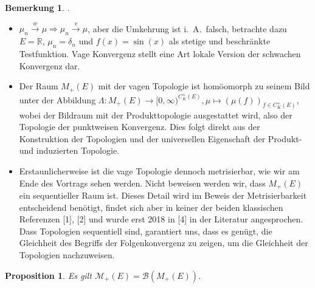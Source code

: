 \documentclass[twoside]{article}
\newtheorem{proposition}[theorem]{Proposition}
\theoremstyle{definition}
\newtheorem{remark}[theorem]{Bemerkung}
\begin{document}
\begin{remark}.
\begin{itemize}
\item $\mu_n \xrightarrow{w} \mu \Longrightarrow \mu_n \xrightarrow{v} \mu$, aber die Umkehrung ist i.\ A.\ falsch, betrachte dazu $E=\mathbb{R}$, $\mu_n = \delta_n$ und $f(x)=\sin(x)$ als stetige und beschränkte Testfunktion. Vage Konvergenz stellt eine Art lokale Version der schwachen Konvergenz dar. 
\item Der Raum $M_+(E)$ mit der vagen Topologie ist homöomorph zu seinem Bild unter der Abbildung $\Lambda: M_+(E) \to [0,\infty)^{C_K^+(E)}, \mu \mapsto (\mu(f))_{f \in C_K^+(E)}$, wobei der Bildraum mit der Produkttopologie ausgestattet wird, also der Topologie der punktweisen Konvergenz. Dies folgt direkt aus der Konstruktion der Topologien und der universellen Eigenschaft der Produkt- und induzierten Topologie.
\item Erstaunlicherweise ist die vage Topologie dennoch metrisierbar, wie wir am Ende des Vortrags sehen werden. Nicht beweisen werden wir, dass $M_+(E)$ ein sequentieller Raum ist. Dieses Detail wird im Beweis der Metrisierbarkeit entscheidend benötigt, findet sich aber in keiner der beiden klassischen Referenzen [1], [2] und wurde erst 2018 in [4] in der Literatur angesprochen. Dass Topologien sequentiell sind, garantiert uns, dass es genügt, die Gleichheit des Begriffs der Folgenkonvergenz zu zeigen, um die Gleichheit der Topologien nachzuweisen. 
\end{itemize}
\end{remark}
\begin{proposition}
Es gilt $\mathcal{M}_+(E) = \mathcal{B}(M_+(E))$.
\end{proposition}
\end{document}
